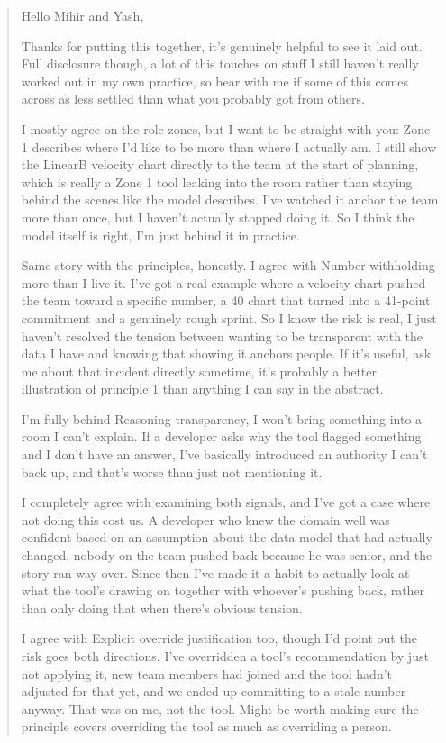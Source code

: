 \documentclass[a4paper,twoside]{bth}
\begin{document}
\begin{quote}
Hello Mihir and Yash,

Thanks for putting this together, it's genuinely helpful to see it laid out. Full disclosure though, a lot of this touches on stuff I still haven't really worked out in my own practice, so bear with me if some of this comes across as less settled than what you probably got from others.

I mostly agree on the role zones, but I want to be straight with you: Zone 1 describes where I'd like to be more than where I actually am. I still show the LinearB velocity chart directly to the team at the start of planning, which is really a Zone 1 tool leaking into the room rather than staying behind the scenes like the model describes. I've watched it anchor the team more than once, but I haven't actually stopped doing it. So I think the model itself is right, I'm just behind it in practice.

Same story with the principles, honestly. I agree with Number withholding more than I live it. I've got a real example where a velocity chart pushed the team toward a specific number, a 40 chart that turned into a 41-point commitment and a genuinely rough sprint. So I know the risk is real, I just haven't resolved the tension between wanting to be transparent with the data I have and knowing that showing it anchors people. If it's useful, ask me about that incident directly sometime, it's probably a better illustration of principle 1 than anything I can say in the abstract.

I'm fully behind Reasoning transparency, I won't bring something into a room I can't explain. If a developer asks why the tool flagged something and I don't have an answer, I've basically introduced an authority I can't back up, and that's worse than just not mentioning it.

I completely agree with examining both signals, and I've got a case where not doing this cost us. A developer who knew the domain well was confident based on an assumption about the data model that had actually changed, nobody on the team pushed back because he was senior, and the story ran way over. Since then I've made it a habit to actually look at what the tool's drawing on together with whoever's pushing back, rather than only doing that when there's obvious tension.

I agree with Explicit override justification too, though I'd point out the risk goes both directions. I've overridden a tool's recommendation by just not applying it, new team members had joined and the tool hadn't adjusted for that yet, and we ended up committing to a stale number anyway. That was on me, not the tool. Might be worth making sure the principle covers overriding the tool as much as overriding a person.


\end{quote}
\end{document}
